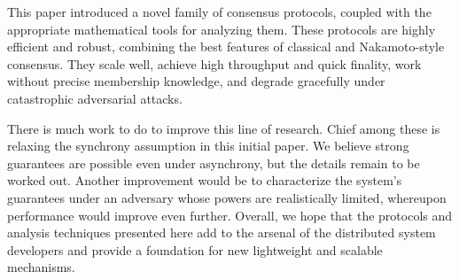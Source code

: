 \documentclass[letterpaper,twocolumn,10pt]{article}
\newcommand{\tronly}[2]{#1}
\theoremstyle{definition}
\begin{document}

This paper introduced a novel family of consensus protocols, coupled with the appropriate mathematical tools for analyzing them.
These protocols are highly efficient and robust, combining the best features of classical and Nakamoto-style consensus.
They scale well, achieve high throughput and quick finality, work without precise membership knowledge, and degrade gracefully under catastrophic adversarial attacks.

There is much work to do to improve this line of research. Chief among these is relaxing the synchrony assumption in this initial paper. We believe strong guarantees are possible even under asynchrony, but the details remain to be worked out. Another improvement would be to characterize the system's guarantees under an adversary whose powers are realistically limited, whereupon performance would improve even further.
Overall, we hope that the protocols and analysis techniques presented here add to the arsenal of the distributed system developers and provide a foundation for new lightweight and scalable mechanisms.

\end{document}
